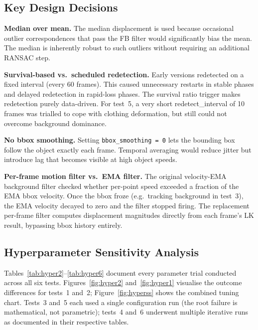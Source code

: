 \documentclass[12pt,a4paper]{article}
\begin{document}
\subsection{Key Design Decisions}

\textbf{Median over mean.} The median displacement is used because occasional outlier
correspondences that pass the FB filter would significantly bias the mean. The median is
inherently robust to such outliers without requiring an additional RANSAC step.

\textbf{Survival-based vs.\ scheduled redetection.} Early versions redetected on a fixed
interval (every 60 frames). This caused unnecessary restarts in stable phases and delayed
redetection in rapid-loss phases. The survival ratio trigger makes redetection purely
data-driven. For test~5, a very short redetect\_interval of 10 frames was trialled to cope
with clothing deformation, but still could not overcome background dominance.

\textbf{No bbox smoothing.} Setting \texttt{bbox\_smoothing\,=\,0} lets the bounding box
follow the object exactly each frame. Temporal averaging would reduce jitter but introduce
lag that becomes visible at high object speeds.

\textbf{Per-frame motion filter vs.\ EMA filter.} The original velocity-EMA background
filter checked whether per-point speed exceeded a fraction of the EMA bbox velocity. Once
the bbox froze (e.g.\ tracking background in test~3), the EMA velocity decayed to zero and
the filter stopped firing. The replacement per-frame filter computes displacement magnitudes
directly from each frame's LK result, bypassing bbox history entirely.

\subsection{Hyperparameter Sensitivity Analysis}

Tables~\ref{tab:hyper2}--\ref{tab:hyper6} document every parameter trial conducted across all six
tests. Figures~\ref{fig:hyper2} and~\ref{fig:hyper1} visualise the outcome differences for tests~1
and~2; Figure~\ref{fig:hyperss} shows the combined tuning chart. Tests~3 and~5 each used a single
configuration run (the root failure is mathematical, not parametric); tests~4 and~6 underwent
multiple iterative runs as documented in their respective tables.
\end{document}
